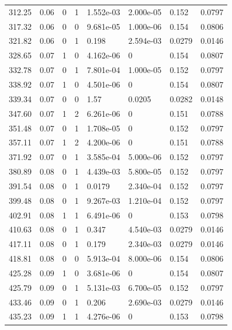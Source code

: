 \documentclass[preview]{standalone}
\begin{document}
{{{\begin{tabular}{L{1.2cm}C{1.2cm} C{0.3cm}C{0.5cm} C{1.4cm}C{1.4cm} C{1.4cm}C{1.4cm}}
  312.25  &  0.06  & 0     &  1 &  1.552e-03  & 2.000e-05  & 0.152 &  0.0797   \\ 
  317.32  &  0.06  & 0     &  0 &  9.681e-05  & 1.000e-06  & 0.154 &  0.0806   \\ 
  321.82  &  0.06  & 0     &  1 &  0.198  & 2.594e-03  & 0.0279 &  0.0146   \\ 
  328.65  &  0.07  & 1     &  0 &  4.162e-06  & 0  & 0.154 &  0.0807   \\ 
  332.78  &  0.07  & 0     &  1 &  7.801e-04  & 1.000e-05  & 0.152 &  0.0797   \\ 
  338.92  &  0.07  & 1     &  0 &  4.501e-06  & 0  & 0.154 &  0.0807   \\ 
  339.34  &  0.07  & 0     &  0 &  1.57  & 0.0205  & 0.0282 &  0.0148   \\ 
  347.60  &  0.07  & 1     &  2 &  6.261e-06  & 0  & 0.151 &  0.0788   \\ 
  351.48  &  0.07  & 0     &  1 &  1.708e-05  & 0  & 0.152 &  0.0797   \\ 
  357.11  &  0.07  & 1     &  2 &  4.200e-06  & 0  & 0.151 &  0.0788   \\ 
  371.92  &  0.07  & 0     &  1 &  3.585e-04  & 5.000e-06  & 0.152 &  0.0797   \\ 
  380.89  &  0.08  & 0     &  1 &  4.439e-03  & 5.800e-05  & 0.152 &  0.0797   \\ 
  391.54  &  0.08  & 0     &  1 &  0.0179  & 2.340e-04  & 0.152 &  0.0797   \\ 
  399.48  &  0.08  & 0     &  1 &  9.267e-03  & 1.210e-04  & 0.152 &  0.0797   \\ 
  402.91  &  0.08  & 1     &  1 &  6.491e-06  & 0  & 0.153 &  0.0798   \\ 
  410.63  &  0.08  & 0     &  1 &  0.347  & 4.540e-03  & 0.0279 &  0.0146   \\ 
  417.11  &  0.08  & 0     &  1 &  0.179  & 2.340e-03  & 0.0279 &  0.0146   \\ 
  418.81  &  0.08  & 0     &  0 &  5.913e-04  & 8.000e-06  & 0.154 &  0.0806   \\ 
  425.28  &  0.09  & 1     &  0 &  3.681e-06  & 0  & 0.154 &  0.0807   \\ 
  425.79  &  0.09  & 0     &  1 &  5.131e-03  & 6.700e-05  & 0.152 &  0.0797   \\ 
  433.46  &  0.09  & 0     &  1 &  0.206  & 2.690e-03  & 0.0279 &  0.0146   \\ 
  435.23  &  0.09  & 1     &  1 &  4.276e-06  & 0  & 0.153 &  0.0798   \\ 

\end{tabular}}}}
\end{document}
